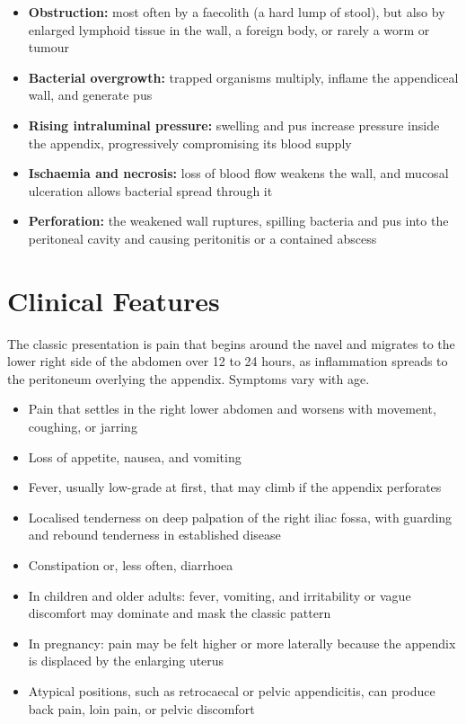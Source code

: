 \begin{itemize}
    \item \textbf{Obstruction:} most often by a faecolith (a hard lump of stool), but also by enlarged lymphoid tissue in the wall, a foreign body, or rarely a worm or tumour
    \item \textbf{Bacterial overgrowth:} trapped organisms multiply, inflame the appendiceal wall, and generate pus
    \item \textbf{Rising intraluminal pressure:} swelling and pus increase pressure inside the appendix, progressively compromising its blood supply
    \item \textbf{Ischaemia and necrosis:} loss of blood flow weakens the wall, and mucosal ulceration allows bacterial spread through it
    \item \textbf{Perforation:} the weakened wall ruptures, spilling bacteria and pus into the peritoneal cavity and causing peritonitis or a contained abscess
\end{itemize}

\section*{Clinical Features}
The classic presentation is pain that begins around the navel and migrates to the lower right side of the abdomen over 12 to 24 hours, as inflammation spreads to the peritoneum overlying the appendix. Symptoms vary with age.

\begin{itemize}
    \item Pain that settles in the right lower abdomen and worsens with movement, coughing, or jarring
    \item Loss of appetite, nausea, and vomiting
    \item Fever, usually low-grade at first, that may climb if the appendix perforates
    \item Localised tenderness on deep palpation of the right iliac fossa, with guarding and rebound tenderness in established disease
    \item Constipation or, less often, diarrhoea
    \item In children and older adults: fever, vomiting, and irritability or vague discomfort may dominate and mask the classic pattern
    \item In pregnancy: pain may be felt higher or more laterally because the appendix is displaced by the enlarging uterus
    \item Atypical positions, such as retrocaecal or pelvic appendicitis, can produce back pain, loin pain, or pelvic discomfort
\end{itemize}


